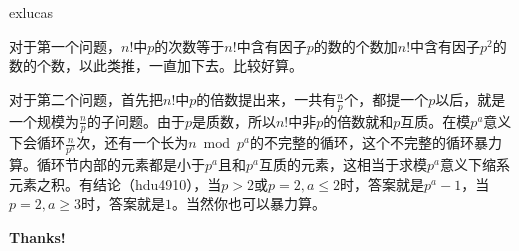 \documentclass{ctexbeamer}        %
\begin{document}
\begin{frame}{exlucas}

对于第一个问题，$n!$中$p$的次数等于$n!$中含有因子$p$的数的个数加$n!$中含有因子$p^2$的数的个数，以此类推，一直加下去。比较好算。

对于第二个问题，首先把$n!$中$p$的倍数提出来，一共有$\frac{n}{p}$个，都提一个$p$以后，就是一个规模为$\frac{n}{p}$的子问题。由于$p$是质数，所以$n!$中非$p$的倍数就和$p$互质。在模$p^a$意义下会循环$\frac{n}{p^a}$次，还有一个长为$n \bmod{p^a}$的不完整的循环，这个不完整的循环暴力算。循环节内部的元素都是小于$p^a$且和$p^a$互质的元素，这相当于求模$p^a$意义下缩系元素之积。有结论（hdu4910），当$p>2$或$p=2,a\le 2$时，答案就是$p^a-1$，当$p=2,a\ge 3$时，答案就是$1$。当然你也可以暴力算。
\end{frame}

\begin{frame}[plain]    %
	\vspace{0.4\textheight}
	\begin{center}
		\Huge\color{blue}\bfseries Thanks!
	\end{center}
\end{frame}
\end{document}
